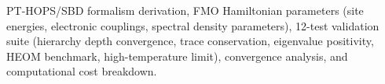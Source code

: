 \documentclass[journal=jpcl,manuscript=letter]{achemso}
\begin{document}

\begin{suppinfo}
PT-HOPS/SBD formalism derivation, FMO Hamiltonian parameters (site energies, electronic couplings, spectral density parameters), 12-test validation suite (hierarchy depth convergence, trace conservation, eigenvalue positivity, HEOM benchmark, high-temperature limit), convergence analysis, and computational cost breakdown.
\end{suppinfo}



\end{document}
